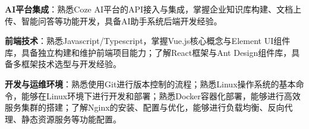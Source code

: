 \item \textbf{AI平台集成}：熟悉Coze AI平台的API接入与集成，掌握企业知识库构建、文档上传、智能问答等功能开发，具备AI助手系统后端开发经验。
\item \textbf{前端技术}：熟悉Javascript/Typescript，掌握Vue.js核心概念与Element UI组件库，具备独立构建和维护前端项目能力；了解React框架与Ant Design组件库，具备多框架技术选型与开发经验。
\item \textbf{开发与运维环境}：熟悉使用Git进行版本控制的流程；熟悉Linux操作系统的基本命令，能够在Linux环境下进行开发和部署；熟悉Docker容器化部署，能够进行高效服务集群的搭建；了解Nginx的安装、配置与优化，能够进行负载均衡、反向代理、静态资源服务等功能配置。